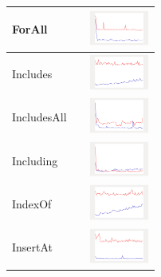 \begin{longtable}{ m{2.5cm} m{8cm} m{2cm} }
ForAll &

&
\includegraphics[width=2cm]{graphs/sequence/small/forALL}
\\\hline

Includes &

&
\includegraphics[width=2cm]{graphs/sequence/small/Includes}
\\\hline

IncludesAll &

&
\includegraphics[width=2cm]{graphs/sequence/small/IncludesAll}
\\\hline

Including &

&
\includegraphics[width=2cm]{graphs/sequence/small/Including}
\\\hline

IndexOf &

&
\includegraphics[width=2cm]{graphs/sequence/small/IndexOf}
\\\hline

InsertAt &

&
\includegraphics[width=2cm]{graphs/sequence/small/InsertAt}
\\\hline


\end{longtable}

